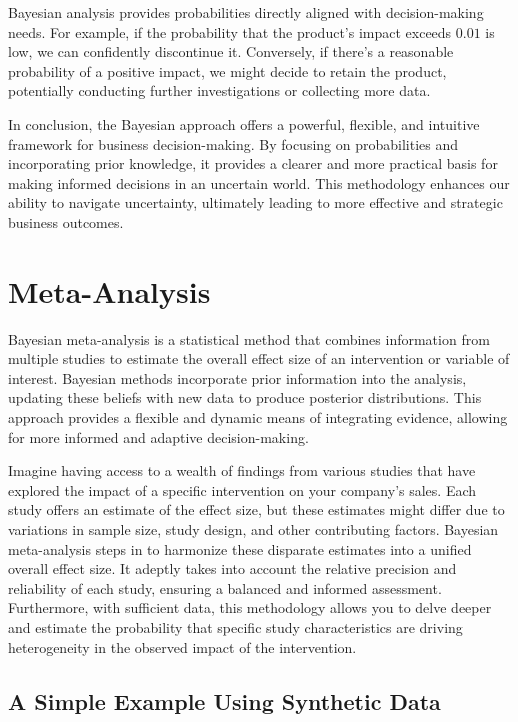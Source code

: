\documentclass[
  letterpaper,
  DIV=11,
  numbers=noendperiod]{scrreprt}
\begin{document}
Bayesian analysis provides probabilities directly aligned with
decision-making needs. For example, if the probability that the
product's impact exceeds \(0.01\) is low, we can confidently discontinue
it. Conversely, if there's a reasonable probability of a positive
impact, we might decide to retain the product, potentially conducting
further investigations or collecting more data.

In conclusion, the Bayesian approach offers a powerful, flexible, and
intuitive framework for business decision-making. By focusing on
probabilities and incorporating prior knowledge, it provides a clearer
and more practical basis for making informed decisions in an uncertain
world. This methodology enhances our ability to navigate uncertainty,
ultimately leading to more effective and strategic business outcomes.

\chapter{Meta-Analysis}\label{meta-analysis}

Bayesian meta-analysis is a statistical method that combines information
from multiple studies to estimate the overall effect size of an
intervention or variable of interest. Bayesian methods incorporate prior
information into the analysis, updating these beliefs with new data to
produce posterior distributions. This approach provides a flexible and
dynamic means of integrating evidence, allowing for more informed and
adaptive decision-making.

Imagine having access to a wealth of findings from various studies that
have explored the impact of a specific intervention on your company's
sales. Each study offers an estimate of the effect size, but these
estimates might differ due to variations in sample size, study design,
and other contributing factors. Bayesian meta-analysis steps in to
harmonize these disparate estimates into a unified overall effect size.
It adeptly takes into account the relative precision and reliability of
each study, ensuring a balanced and informed assessment. Furthermore,
with sufficient data, this methodology allows you to delve deeper and
estimate the probability that specific study characteristics are driving
heterogeneity in the observed impact of the intervention.

\section{A Simple Example Using Synthetic
Data}\label{a-simple-example-using-synthetic-data}
\end{document}
